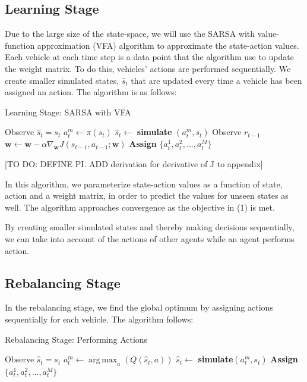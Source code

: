 \documentclass[letterpaper, 10 pt, conference]{ieeeconf}  %
\DeclareMathOperator*{\argmax}{arg\,max}
\begin{document}
\subsection{Learning Stage}
Due to the large size of the state-space, we will use the SARSA with value-function approximation (VFA) algorithm to approximate the state-action values. Each vehicle at each time step is a data point that the algorithm use to update the weight matrix. To do this, vehicles' actions are performed sequentially. We create smaller simulated states, $\hat{s}_t$ that are updated every time a vehicle has been assigned an action. The algorithm is as follows:
\begin{algorithm}[H]
\caption{Learning Stage: SARSA with VFA}
\begin{algorithmic}
    \State Observe $\hat{s}_t=s_t$
            \State $a^m_t \leftarrow \pi(s_t)$ 
            \State $\hat{s}_t \leftarrow$ \textbf{simulate} $(a^m_t,s_t)$
        \EndIf
        \State Observe $r_{t-1}$
        \State $\textbf{w} \leftarrow \textbf{w} - \alpha \nabla_{ \textbf{w}} J(s_{t-1},a_{t-1};\textbf{w})$
    \EndFor
    \State\textbf{Assign} $\{a^1_t,a^2_t,...,a^M_t\}$
\EndFor
\end{algorithmic}
\end{algorithm}
 [TO DO: DEFINE PI. ADD derivation for derivative of J to appendix]
 
In this algorithm, we parameterize state-action values as a function of state, action and a weight matrix, in order to predict the values for unseen states as well. The algorithm approaches convergence as the objective in (1) is met.

By creating smaller simulated states and thereby making decisions sequentially, we can take into account of the actions of other agents while an agent performs action.  

\subsection{Rebalancing Stage}
In the rebalancing stage, we find the global optimum by assigning actions sequentially for each vehicle. The algorithm follows: 
\begin{algorithm}[H]
\caption{Rebalancing Stage: Performing Actions}
\begin{algorithmic}
    \State Observe $\hat{s}_t=s_t$
            \State $a_t^m \leftarrow \argmax_a(Q(\hat{s}_t,a))$
            \State $\hat{s}_t \leftarrow$ \textbf{simulate}$(a^m_t,s_t)$
        \EndIf
    \EndFor
    \State\textbf{Assign}$\{a^1_t,a^2_t,...,a^M_t\}$
\EndFor
\end{algorithmic}
\end{algorithm}
\end{document}
